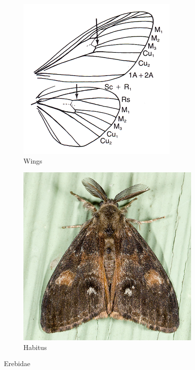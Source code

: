 \documentclass[letterpaper, 11pt]{article}
\begin{document}
\begin{figure}[ht!]
    \centering
    \begin{subfigure}[ht!]{0.38\textwidth}
        \includegraphics[width=\textwidth]{image04}
        \caption{Wings}
        \label{fig:erebid1}
    \end{subfigure}
    \qquad %
    \begin{subfigure}[ht!]{0.38\textwidth}
        \includegraphics[width=\textwidth]{image03}
        \caption{Habitus}
        \label{fig:erebid2}
    \end{subfigure}
    \caption{Erebidae}\label{fig:erebids}
\end{figure}
\end{document}
